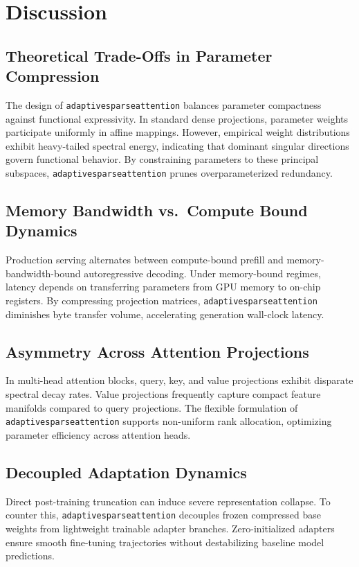 \section{Discussion}

\subsection{Theoretical Trade-Offs in Parameter Compression}
The design of \texttt{adaptivesparseattention} balances parameter compactness against functional expressivity. In standard dense projections, parameter weights participate uniformly in affine mappings. However, empirical weight distributions exhibit heavy-tailed spectral energy, indicating that dominant singular directions govern functional behavior. By constraining parameters to these principal subspaces, \texttt{adaptivesparseattention} prunes overparameterized redundancy.

\subsection{Memory Bandwidth vs.\ Compute Bound Dynamics}
Production serving alternates between compute-bound prefill and memory-bandwidth-bound autoregressive decoding. Under memory-bound regimes, latency depends on transferring parameters from GPU memory to on-chip registers. By compressing projection matrices, \texttt{adaptivesparseattention} diminishes byte transfer volume, accelerating generation wall-clock latency.

\subsection{Asymmetry Across Attention Projections}
In multi-head attention blocks, query, key, and value projections exhibit disparate spectral decay rates. Value projections frequently capture compact feature manifolds compared to query projections. The flexible formulation of \texttt{adaptivesparseattention} supports non-uniform rank allocation, optimizing parameter efficiency across attention heads.

\subsection{Decoupled Adaptation Dynamics}
Direct post-training truncation can induce severe representation collapse. To counter this, \texttt{adaptivesparseattention} decouples frozen compressed base weights from lightweight trainable adapter branches. Zero-initialized adapters ensure smooth fine-tuning trajectories without destabilizing baseline model predictions.

